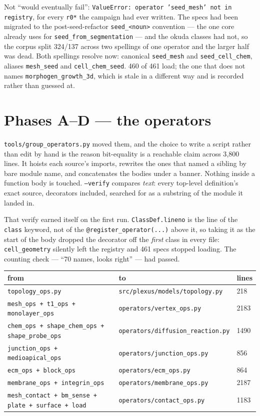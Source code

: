 \documentclass[11pt,a4paper]{article}
\newcommand{\code}[1]{\texttt{\small #1}}
\begin{document}
Not ``would eventually fail'': \code{ValueError: operator 'seed\_mesh' not in registry}, for every
\code{r0*} the campaign had ever written. The specs had been migrated to the post-seed-refactor
\code{seed\_<noun>} convention --- the one core already uses for \code{seed\_from\_segmentation} ---
and the okuda classes had not, so the corpus split 324/137 across two spellings of one operator and
the larger half was dead. Both spellings resolve now: canonical \code{seed\_mesh} and
\code{seed\_cell\_chem}, aliases \code{mesh\_seed} and \code{cell\_chem\_seed}. 460 of 461 load; the
one that does not names \code{morphogen\_growth\_3d}, which is stale in a different way and is
recorded rather than guessed at.

\section{Phases A--D --- the operators}

\code{tools/group\_operators.py} moved them, and the choice to write a script rather than edit by
hand is the reason bit-equality is a reachable claim across 3{,}800 lines. It hoists each source's
imports, rewrites the ones that named a sibling by bare module name, and concatenates the bodies
under a banner. Nothing inside a function body is touched. \code{--verify} compares \emph{text}:
every top-level definition's exact source, decorators included, searched for as a substring of the
module it landed in.

That verify earned itself on the first run. \code{ClassDef.lineno} is the line of the \code{class}
keyword, not of the \code{@register\_operator(...)} above it, so taking it as the start of the body
dropped the decorator off the \emph{first} class in every file: \code{cell\_geometry} silently left
the registry and 461 specs stopped loading. The counting check --- ``70 names, looks right'' --- had
passed.

\begin{center}\small
\begin{tabular}{@{}lll@{}}\toprule
from & to & lines\\\midrule
\code{topology\_ops.py} & \code{src/plexus/models/topology.py} & 218\\
\code{mesh\_ops + t1\_ops + monolayer\_ops} & \code{operators/vertex\_ops.py} & 2183\\
\code{chem\_ops + shape\_chem\_ops + shape\_probe\_ops} & \code{operators/diffusion\_reaction.py} & 1490\\
\code{junction\_ops + medioapical\_ops} & \code{operators/junction\_ops.py} & 856\\
\code{ecm\_ops + block\_ops} & \code{operators/ecm\_ops.py} & 864\\
\code{membrane\_ops + integrin\_ops} & \code{operators/membrane\_ops.py} & 2187\\
\code{mesh\_contact + bm\_sense + plate + surface + load} & \code{operators/contact\_ops.py} & 1183\\
\bottomrule
\end{tabular}
\end{center}
\end{document}
